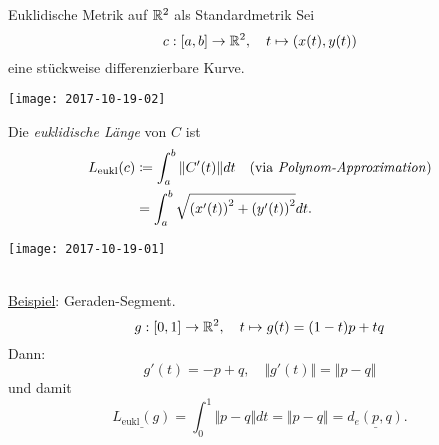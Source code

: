 \begin{example}{Euklidische Metrik auf $ \R^2 $ als Standardmetrik}
  Sei
  \begin{equation*}
    c : [a,b] \to \mathbb{R}^2, \quad t \mapsto (x(t), y(t))
  \end{equation*}
  eine stückweise differenzierbare Kurve. \\
  \begin{marginfigure}
    \texttt{[image: 2017-10-19-02]}
    \caption{$ c $ bildet ein Intervall $ [a,b] \subseteq \R $ auf eine Kurve im $ \R^2 $ ab.}
  \end{marginfigure}
  Die \emph{euklidische Länge} von $ C $ ist
  \begin{align*}
    L_{\text{eukl}}(c) &\coloneqq \int_a^b \Vert C'(t) \Vert dt \quad \text{(via \emph{Polynom-Approximation})} \\
     &= \int_a^b \sqrt{\left( x'(t) \right)^2 + \left( y'(t) \right)^2}dt\text{.}
  \end{align*}
  \begin{marginfigure}
    \texttt{[image: 2017-10-19-01]}
    \caption{Durch \emph{Polynom-Approximation} wird eine Kurve sukzessive angenähert.}
  \end{marginfigure}
   \ \\
  \underline{Beispiel}: Geraden-Segment.
  \begin{equation*}
    g: [0,1] \to \mathbb{R}^2, \quad t \mapsto g(t) = (1-t)p + tq
  \end{equation*}
  Dann:
  \begin{equation*}
    g'(t) = -p+q, \quad \Vert g'(t) \Vert = \Vert p - q \Vert
  \end{equation*}
  und damit
  \begin{equation*}
    \underline{L_{\text{eukl}}(g)} = \int_0^1\Vert p - q \Vert dt = \Vert p - q \Vert = \underline{d_e(p,q)}\text{.}
  \end{equation*}
\end{example}

